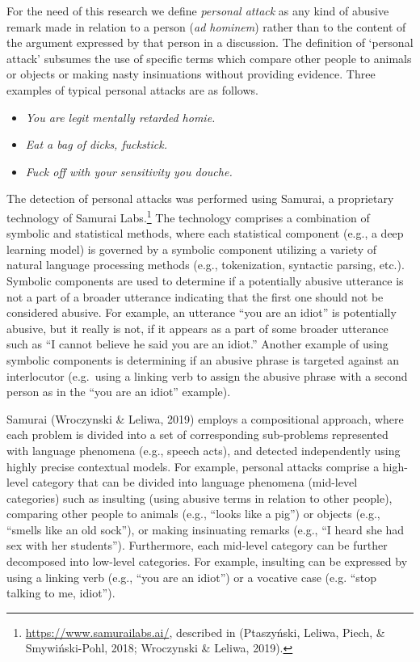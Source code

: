 \documentclass[10pt,]{scrartcl}
\begin{document}
For the need of this research we define \textit{personal attack} as any
kind of abusive remark made in relation to a person
(\textit{ad hominem}) rather than to the content of the argument
expressed by that person in a discussion. The definition of `personal
attack' subsumes the use of specific terms which compare other people to
animals or objects or making nasty insinuations without providing
evidence. Three examples of typical personal attacks are as follows.

\begin{itemize} 
\item \emph{You are legit mentally retarded homie.}
\item \emph {Eat a bag of dicks, fuckstick.}
\item \emph {Fuck off with your sensitivity you douche.} 
\end{itemize}

The detection of personal attacks was performed using Samurai, a
proprietary technology of Samurai Labs.\footnote{\url{https://www.samurailabs.ai/},
  described in (Ptaszyński, Leliwa, Piech, \& Smywiński-Pohl, 2018;
  Wroczynski \& Leliwa, 2019).} The technology comprises a combination
of symbolic and statistical methods, where each statistical component
(e.g., a deep learning model) is governed by a symbolic component
utilizing a variety of natural language processing methods (e.g.,
tokenization, syntactic parsing, etc.). Symbolic components are used to
determine if a potentially abusive utterance is not a part of a broader
utterance indicating that the first one should not be considered
abusive. For example, an utterance ``you are an idiot'' is potentially
abusive, but it really is not, if it appears as a part of some broader
utterance such as ``I cannot believe he said you are an idiot.'' Another
example of using symbolic components is determining if an abusive phrase
is targeted against an interlocutor (e.g.~using a linking verb to assign
the abusive phrase with a second person as in the ``you are an idiot''
example).

Samurai (Wroczynski \& Leliwa, 2019) employs a compositional approach,
where each problem is divided into a set of corresponding sub-problems
represented with language phenomena (e.g., speech acts), and detected
independently using highly precise contextual models. For example,
personal attacks comprise a high-level category that can be divided into
language phenomena (mid-level categories) such as insulting (using
abusive terms in relation to other people), comparing other people to
animals (e.g., ``looks like a pig'') or objects (e.g., ``smells like an
old sock''), or making insinuating remarks (e.g., ``I heard she had sex
with her students''). Furthermore, each mid-level category can be
further decomposed into low-level categories. For example, insulting can
be expressed by using a linking verb (e.g., ``you are an idiot'') or a
vocative case (e.g. ``stop talking to me, idiot'').
\end{document}
